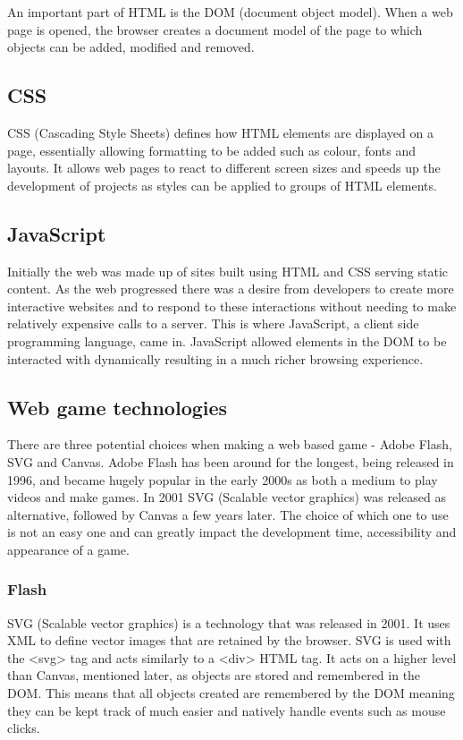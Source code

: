\documentclass[12pt,a4paper]{report}
\begin{document}
An important part of HTML is the DOM (document object model). When a web page is opened, the browser creates a document model of the page to which objects can be added, modified and removed. 

\subsection{CSS}
CSS (Cascading Style Sheets) defines how HTML elements are displayed on a page, essentially allowing formatting to be added such as colour, fonts and layouts. It allows web pages to react to different screen sizes and speeds up the development of projects as styles can be applied to groups of HTML elements. 

\subsection{JavaScript}
Initially the web was made up of sites built using HTML and CSS serving static content. As the web progressed there was a desire from developers to create more interactive websites and to respond to these interactions without needing to make relatively expensive calls to a server. This is where JavaScript, a client side programming language, came in. JavaScript allowed elements in the DOM to be interacted with dynamically resulting in a much richer browsing experience.

\subsection{Web game technologies}
There are three potential choices when making a web based game - Adobe Flash, SVG and Canvas. Adobe Flash has been around for the longest, being released in 1996, and became hugely popular in the early 2000s as both a medium to play videos and make games. In 2001 SVG (Scalable vector graphics) was released as alternative, followed by Canvas a few years later. The choice of which one to use is not an easy one and can greatly impact the development time, accessibility and appearance of a game. 

\subsubsection{Flash}
SVG (Scalable vector graphics) is a technology that was released in 2001. 
It uses XML to define vector images that are retained by the browser. SVG is used with the <svg> tag and acts similarly to a <div> HTML tag. It acts on a higher level than Canvas, mentioned later, as objects are stored and remembered in the DOM. This means that all objects created are remembered by the DOM meaning they can be kept track of much easier and natively handle events such as mouse clicks.
\end{document}
